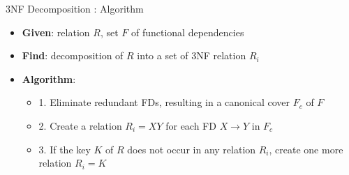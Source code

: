 \documentclass[aspectratio=169, xcolor=dvipsnames]{beamer}
\begin{document}
\begin{frame}{3NF Decomposition : Algorithm}
    \begin{itemize}[<+->]
        \item \textbf{Given}: relation $R$, set $F$ of functional dependencies
        \item \textbf{Find}: decomposition of $R$ into a set of 3NF relation $R_i$
        \item \textbf{Algorithm}:
        \begin{itemize}
            \item[$\triangleright$] 1. Eliminate redundant FDs, resulting in a canonical cover $F_c$ of $F$
            \item[$\triangleright$] 2. Create a relation $R_i = XY$ for each FD $X \rightarrow Y$ in $F_c$
            \item[$\triangleright$] 3. If the key $K$ of $R$ does not occur in any relation $R_i$, create one more relation $R_i = K$
        \end{itemize}
    \end{itemize}
\end{frame}
\end{document}

